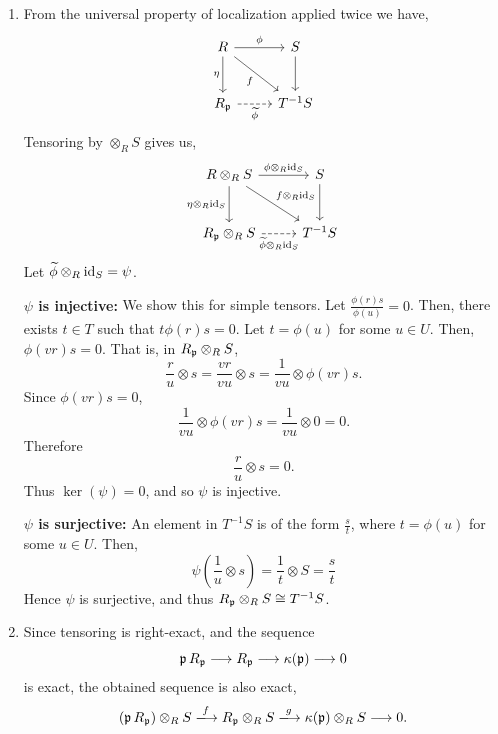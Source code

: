 \documentclass[Notebook.tex]{subfiles}
\begin{document}
\begin{solution}
    \bbni
    \begin{enumerate}
        \item From the universal property of localization applied twice we have, 
        \[
        \begin{tikzcd}[row sep=2.5em, column sep=2.5em]
            R \arrow[r, "\phi"] \ar[d, "\eta", swap] \arrow[dr, "f"'] & S \arrow[d,] \\
            R_{\fp} \ar[dashed, r, "\widetilde{\phi}", swap] & T^{-1}S
        \end{tikzcd}
        \]
        Tensoring by $\otimes_R S$ gives us,  
        \[
        \begin{tikzcd}[row sep=2.5em, column sep=2.5em]
            R \otimes_R S\arrow[r, "\phi \otimes_R \id_S"] \ar[d, "\eta \otimes_R \id_S", swap] \arrow[dr, "f\otimes_R \id_S"] & S \arrow[d,] \\
            R_{\fp} \otimes_R S \ar[dashed, r, "\widetilde{\phi} \otimes_R \id_S", swap] & T^{-1}S
        \end{tikzcd}
        \]
        Let $\widetilde{\phi}\otimes_R \operatorname{id}_S = \psi$. 
        
        \textbf{$\psi$ is injective:} We show this for simple tensors. Let $\frac{\phi(r)s}{\phi(u)} = 0$. Then, there exists $t \in T$ such that $t \phi(r) s = 0$. Let $t = \phi(u)$ for some $u \in U$. Then, $\phi(vr) s = 0$. That is, in $R_{\operatorname{\mathfrak{p}}}\otimes_R S$,
        \[
        \frac{r}{u}\otimes s
        =
        \frac{vr}{vu}\otimes s
        =
        \frac{1}{vu}\otimes \phi(vr)s.
        \]
        Since $\phi(vr)s=0$, 
        \[
        \frac{1}{vu}\otimes \phi(vr)s
        =
        \frac{1}{vu}\otimes 0
        =
        0.
        \]
        Therefore
        \[
        \frac{r}{u}\otimes s = 0.
        \]
        Thus $\ker(\psi)=0$, and so $\psi$ is injective.

        \textbf{$\psi$ is surjective: } An element in $T^{-1}S$ is of the form $\frac{s}{t}$, where $t = \phi(u)$ for some $u \in U$. Then, 
        \[\psi\left(\frac{1}{u} \otimes s\right) = \frac{1}{t} \otimes S = \frac{s}{t}\]
        Hence $\psi$ is surjective, and thus $R_{\operatorname{\mathfrak{p}}} \otimes_R S \cong T^{-1}S$. 

        \item Since tensoring is right-exact, and the sequence 
         \[
        \operatorname{\mathfrak{p}} R_{\operatorname{\mathfrak{p}}}\longrightarrow R_{\operatorname{\mathfrak{p}}}\longrightarrow \kappa(\operatorname{\mathfrak{p}})\longrightarrow 0
        \]
        is exact, the obtained sequence is also exact,
        \[
        (\fp R_{\fp})\otimes_R S \xlongrightarrow{f} R_{\fp}\otimes_R S \xlongrightarrow{g} \kappa(\fp)\otimes_R S \longrightarrow 0.
        \]
        

\end{enumerate}
\end{solution}
\end{document}

